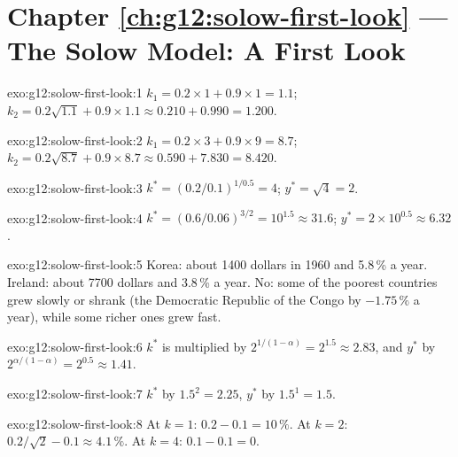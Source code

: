 \section*{Chapter \ref{ch:g12:solow-first-look} --- The Solow Model: A First Look}

\begin{solution}{exo:g12:solow-first-look:1}
$k_1 = 0.2 \times 1 + 0.9 \times 1 = 1.1$; $k_2 = 0.2\sqrt{1.1} + 0.9 \times 1.1 \approx 0.210 + 0.990 = 1.200$.
\end{solution}

\begin{solution}{exo:g12:solow-first-look:2}
$k_1 = 0.2 \times 3 + 0.9 \times 9 = 8.7$; $k_2 = 0.2\sqrt{8.7} + 0.9 \times 8.7 \approx 0.590 + 7.830 = 8.420$.
\end{solution}

\begin{solution}{exo:g12:solow-first-look:3}
$k^* = (0.2/0.1)^{1/0.5} = 4$; $y^* = \sqrt{4} = 2$.
\end{solution}

\begin{solution}{exo:g12:solow-first-look:4}
$k^* = (0.6/0.06)^{3/2} = 10^{1.5} \approx 31.6$; $y^* = 2 \times 10^{0.5} \approx 6.32$.
\end{solution}

\begin{solution}{exo:g12:solow-first-look:5}
Korea: about 1400 dollars in 1960 and 5.8\,\% a year. Ireland: about 7700 dollars and 3.8\,\% a year. No: some of the poorest countries grew slowly or shrank (the
Democratic Republic of the Congo by $-1.75\,\%$ a year), while some richer ones grew fast.
\end{solution}

\begin{solution}{exo:g12:solow-first-look:6}
$k^*$ is multiplied by $2^{1/(1 - \alpha)} = 2^{1.5} \approx 2.83$, and $y^*$ by $2^{\alpha/(1 - \alpha)} = 2^{0.5} \approx 1.41$.
\end{solution}

\begin{solution}{exo:g12:solow-first-look:7}
$k^*$ by $1.5^{2} = 2.25$, $y^*$ by $1.5^{1} = 1.5$.
\end{solution}

\begin{solution}{exo:g12:solow-first-look:8}
At $k = 1$: $0.2 - 0.1 = 10\,\%$. At $k = 2$: $0.2/\sqrt{2} - 0.1 \approx 4.1\,\%$. At $k = 4$: $0.1 - 0.1 = 0$.
\end{solution}

